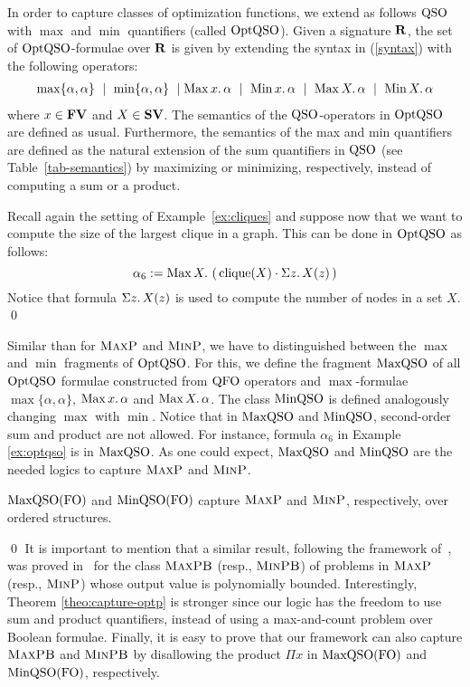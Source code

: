 In order to capture classes of optimization functions, we extend as follows ${\rm QSO}$ with $\max$ and $\min$ quantifiers (called ${\rm OptQSO}$). 
Given a signature $\mathbf{R}$, the set of ${\rm OptQSO}$-formulae over $\mathbf{R}$ is given by extending the syntax in (\ref{syntax}) with the following operators:
\begin{align*}
\max\{\alpha,\alpha\} \ \mid\ \min\{\alpha,\alpha\} \ \mid \maxa{x} \alpha \ \mid \ \mina{x} \alpha \ \mid \ \maxa{X} \alpha \ \mid \ \mina{X} \alpha 
\end{align*}
where $x \in \mathbf{FV}$ and $X \in \mathbf{SV}$. The semantics of the ${\rm QSO}$-operators in ${\rm OptQSO}$ are defined as usual. Furthermore, the semantics of the max and min quantifiers are defined as the natural extension of the sum quantifiers in ${\rm QSO}$ (see Table~\ref{tab-semantics}) by maximizing or minimizing, respectively, instead of computing a sum or a product. 
\begin{exa}\label{ex:optqso}
	Recall again the setting of Example~\ref{ex:cliques} and suppose now that we want to compute the size of the largest clique in a graph. This can be done in ${\rm OptQSO}$ as follows:
	\[
\alpha_6 := \operatorname{Max}{X}.\, \left( \, \operatorname{clique}(X) \cdot \Sigma{z}.\, X(z)  \, \right)
	\]
	Notice that formula $\Sigma{z}.\, X(z)$ is used to compute the number of nodes in a set $X$.  \qed
\end{exa}
Similar than for $\text{\sc MaxP}$ and $\text{\sc MinP}$, we have to distinguished between the $\max$ and $\min$ fragments of ${\rm OptQSO}$. For this, we define the fragment ${\rm MaxQSO}$ of all ${\rm OptQSO}$ formulae constructed from ${\rm QFO}$ operators and $\max$-formulae $\max\{\alpha,\alpha\}$, $\operatorname{Max}{x}.\, \alpha$ and  $\operatorname{Max}{X}.\, \alpha$.
The class ${\rm MinQSO}$ is defined analogously changing $\max$ with $\min$. Notice that in ${\rm MaxQSO}$ and ${\rm MinQSO}$, second-order sum and product are not allowed. For instance, formula $\alpha_6$ in Example \ref{ex:optqso} is in ${\rm MaxQSO}$.
As one could expect, ${\rm MaxQSO}$ and ${\rm MinQSO}$ are the needed logics to capture $\text{\sc MaxP}$ and $\text{\sc MinP}$.
\begin{thm} \label{theo:capture-optp}
	${\rm MaxQSO}({\rm FO})$ and ${\rm MinQSO}({\rm FO})$ capture $\text{\sc MaxP}$ and $\text{\sc MinP}$, respectively, over ordered structures.
\end{thm}
\proof

\qed
It is important to mention that a similar result, following the framework of~\cite{SalujaST95}, was proved in~\cite{kolaitis1994logical} for the class $\text{\sc MaxPB}$ (resp., $\text{\sc MinPB}$) of problems in $\text{\sc MaxP}$ (resp., $\text{\sc MinP}$) whose output value is polynomially bounded.
Interestingly, Theorem \ref{theo:capture-optp} is stronger since our logic has the freedom to use sum and product quantifiers, instead of using a max-and-count problem over Boolean formulae. 
Finally, it is easy to prove that our framework can also capture $\text{\sc MaxPB}$ and $\text{\sc MinPB}$ by disallowing the product $\Pi x$ in ${\rm MaxQSO}({\rm FO})$ and ${\rm MinQSO}({\rm FO})$, respectively.
